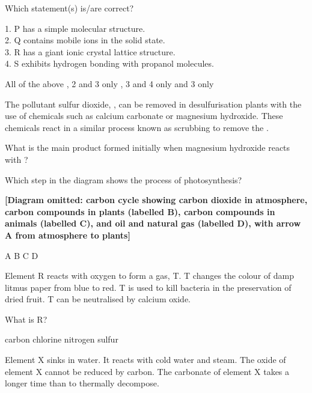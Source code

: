 \documentclass[11pt]{exam}
\begin{document}
\begin{questions}
Which statement(s) is/are correct?

1. P has a simple molecular structure. \\
2. Q contains mobile ions in the solid state. \\
3. R has a giant ionic crystal lattice structure. \\
4. S exhibits hydrogen bonding with propanol molecules.

\begin{choices}
\choice All of the above
, 2 and 3 only
, 3 and 4 only
 and 3 only
\end{choices}

\question The pollutant sulfur dioxide, , can be removed in desulfurisation plants with the use of chemicals such as calcium carbonate or magnesium hydroxide. These chemicals react in a similar process known as scrubbing to remove the .

What is the main product formed initially when magnesium hydroxide reacts with ?

\begin{choices}
\choice {}
\choice {}
\choice {}
\choice {}
\end{choices}

\question Which step in the diagram shows the process of photosynthesis?

\textbf{[Diagram omitted: carbon cycle showing carbon dioxide in atmosphere, carbon compounds in plants (labelled B), carbon compounds in animals (labelled C), and oil and natural gas (labelled D), with arrow A from atmosphere to plants]}

\begin{choices}
\choice A
\choice B
\choice C
\choice D
\end{choices}

\newpage

\question Element R reacts with oxygen to form a gas, T. T changes the colour of damp litmus paper from blue to red. T is used to kill bacteria in the preservation of dried fruit. T can be neutralised by calcium oxide.

What is R?

\begin{choices}
\choice carbon
\choice chlorine
\choice nitrogen
\choice sulfur
\end{choices}

\question Element X sinks in water. It reacts with cold water and steam. The oxide of element X cannot be reduced by carbon. The carbonate of element X takes a longer time than  to thermally decompose.


\end{questions}
\end{document}
